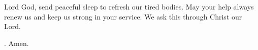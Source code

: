 \lettrine[loversize=0.15,lines=2]{L}{}ord God,
send peaceful sleep
to refresh our tired bodies.
May your help always renew us
and keep us strong in your service.
We ask this through Christ our Lord.
\par \Rbar. Amen.
